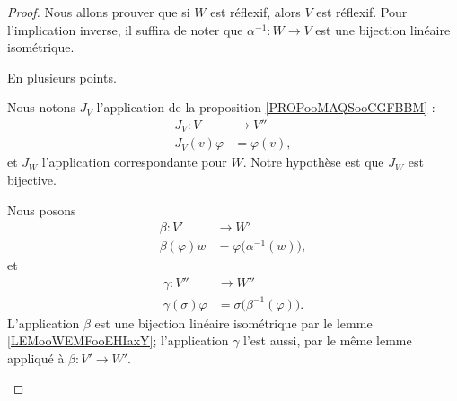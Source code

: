 \begin{proof}
	Nous allons prouver que si \( W\) est réflexif, alors \( V\) est réflexif. Pour l'implication inverse, il suffira de noter que \( \alpha^{-1}\colon W\to V\) est une bijection linéaire isométrique.

	En plusieurs points.
	\begin{subproof}
		Nous notons \( J_V\) l'application de la proposition \ref{PROPooMAQSooCGFBBM} :
		\begin{equation}
			\begin{aligned}
				J_V\colon V   & \to V''       \\
				J_V(v)\varphi & = \varphi(v),
			\end{aligned}
		\end{equation}
		et \( J_W\) l'application correspondante pour \( W\). Notre hypothèse est que \( J_W\) est bijective.

		Nous posons
		\begin{equation}
			\begin{aligned}
				\beta\colon V'  & \to W'                              \\
				\beta(\varphi)w & =\varphi\big( \alpha^{-1}(w) \big),
			\end{aligned}
		\end{equation}
		et
		\begin{equation}
			\begin{aligned}
				\gamma\colon V''      & \to W''                                 \\
				\gamma(\sigma)\varphi & =\sigma\big( \beta^{-1}(\varphi) \big).
			\end{aligned}
		\end{equation}
		L'application \( \beta\) est une bijection linéaire isométrique par le lemme \ref{LEMooWEMFooEHIaxY}; l'application \( \gamma\) l'est aussi, par le même lemme appliqué à \( \beta\colon V'\to W'\).


\end{subproof}
\end{proof}
